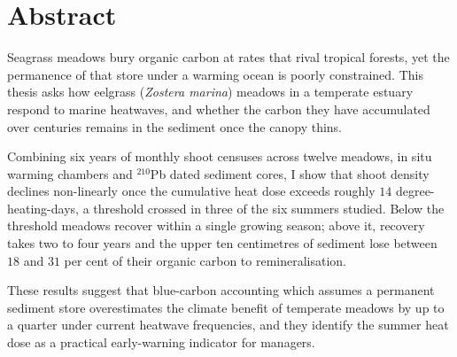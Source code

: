 \chapter*{Abstract}

Seagrass meadows bury organic carbon at rates that rival tropical forests,
yet the permanence of that store under a warming ocean is poorly
constrained. This thesis asks how eelgrass (\emph{Zostera marina})
meadows in a temperate estuary respond to marine heatwaves, and whether
the carbon they have accumulated over centuries remains in the sediment
once the canopy thins.

Combining six years of monthly shoot censuses across twelve meadows,
in situ warming chambers and \(^{210}\)Pb dated sediment cores,
I show that shoot density declines non-linearly once the cumulative
heat dose exceeds roughly \(14\) degree-heating-days, a threshold crossed
in three of the six summers studied. Below the threshold meadows recover
within a single growing season; above it, recovery takes two to four
years and the upper ten centimetres of sediment lose between \(18\) and
\(31\) per cent of their organic carbon to remineralisation.

These results suggest that blue-carbon accounting which assumes a
permanent sediment store overestimates the climate benefit of temperate
meadows by up to a quarter under current heatwave frequencies, and they
identify the summer heat dose as a practical early-warning indicator for
managers.

\cleardoublepage
